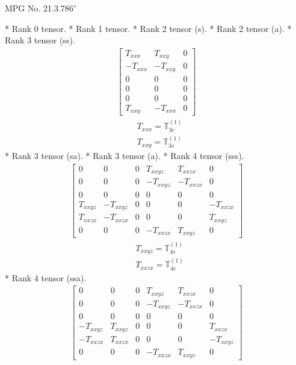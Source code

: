 \documentclass[fleqn,8pt,landscape]{jsarticle}
\begin{document}
\setcounter{MaxMatrixCols}{32}

\renewcommand{\tablename}{Table~}
\renewcommand{\figurename}{Figure~}
\begin{center}
\LARGE
MPG No. 21.3.78\quad$6'$
\end{center}
* Rank 0 tensor.
* Rank 1 tensor.
* Rank 2 tensor (s).
* Rank 2 tensor (a).
* Rank 3 tensor (ss).
\begin{align*}
\begin{bmatrix} T_{xxx} & T_{xxy} & 0 \\ - T_{xxx} & - T_{xxy} & 0 \\ 0 & 0 & 0 \\ 0 & 0 & 0 \\ 0 & 0 & 0 \\ T_{xxy} & - T_{xxx} & 0 \end{bmatrix}
\end{align*}
\begin{align*}
& T_{xxx} = \mathbb{T}_{3c}^{(1)} \\
& T_{xxy} = \mathbb{T}_{3s}^{(1)}
\end{align*}
* Rank 3 tensor (sa).
* Rank 3 tensor (a).
* Rank 4 tensor (sss).
\begin{align*}
\begin{bmatrix} 0 & 0 & 0 & T_{xxyz} & T_{xxzx} & 0 \\ 0 & 0 & 0 & - T_{xxyz} & - T_{xxzx} & 0 \\ 0 & 0 & 0 & 0 & 0 & 0 \\ T_{xxyz} & - T_{xxyz} & 0 & 0 & 0 & - T_{xxzx} \\ T_{xxzx} & - T_{xxzx} & 0 & 0 & 0 & T_{xxyz} \\ 0 & 0 & 0 & - T_{xxzx} & T_{xxyz} & 0 \end{bmatrix}
\end{align*}
\begin{align*}
& T_{xxyz} = \mathbb{T}_{4s}^{(1)} \\
& T_{xxzx} = \mathbb{T}_{4c}^{(1)}
\end{align*}
* Rank 4 tensor (ssa).
\begin{align*}
\begin{bmatrix} 0 & 0 & 0 & T_{xxyz} & T_{xxzx} & 0 \\ 0 & 0 & 0 & - T_{xxyz} & - T_{xxzx} & 0 \\ 0 & 0 & 0 & 0 & 0 & 0 \\ - T_{xxyz} & T_{xxyz} & 0 & 0 & 0 & T_{xxzx} \\ - T_{xxzx} & T_{xxzx} & 0 & 0 & 0 & - T_{xxyz} \\ 0 & 0 & 0 & - T_{xxzx} & T_{xxyz} & 0 \end{bmatrix}
\end{align*}
\end{document}
